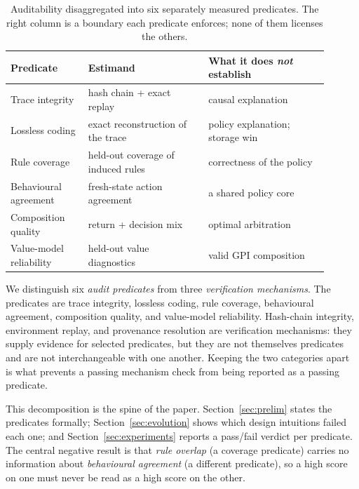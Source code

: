 \documentclass[11pt]{article}
\begin{document}
\begin{table}[t]
\centering\small
\caption{Auditability disaggregated into six separately measured predicates. The right column is a
boundary each predicate enforces; none of them licenses the others.}
\label{tab:props}
\begin{tabular}{@{}p{0.22\linewidth}p{0.34\linewidth}p{0.34\linewidth}@{}}
\toprule
Predicate & Estimand & What it does \emph{not} establish \\
\midrule
Trace integrity & hash chain + exact replay & causal explanation \\
Lossless coding & exact reconstruction of the trace & policy explanation; storage win \\
Rule coverage & held-out coverage of induced rules & correctness of the policy \\
Behavioural agreement & fresh-state action agreement & a shared policy core \\
Composition quality & return + decision mix & optimal arbitration \\
Value-model reliability & held-out value diagnostics & valid GPI composition \\
\bottomrule
\end{tabular}
\end{table}

We distinguish six \emph{audit predicates} from three \emph{verification mechanisms}. The predicates
are trace integrity, lossless coding, rule coverage, behavioural agreement, composition quality, and
value-model reliability. Hash-chain integrity, environment replay, and provenance resolution are
verification mechanisms: they supply evidence for selected predicates, but they are not themselves
predicates and are not interchangeable with one another. Keeping the two categories apart is what
prevents a passing mechanism check from being reported as a passing predicate.

This decomposition is the spine of the paper. Section~\ref{sec:prelim} states the predicates formally;
Section~\ref{sec:evolution} shows which design intuitions failed each one; and
Section~\ref{sec:experiments} reports a pass/fail verdict per predicate. The central negative result
is that \emph{rule overlap} (a coverage predicate) carries no information about \emph{behavioural
agreement} (a different predicate), so a high score on one must never be read as a high score on the
other.
\end{document}
